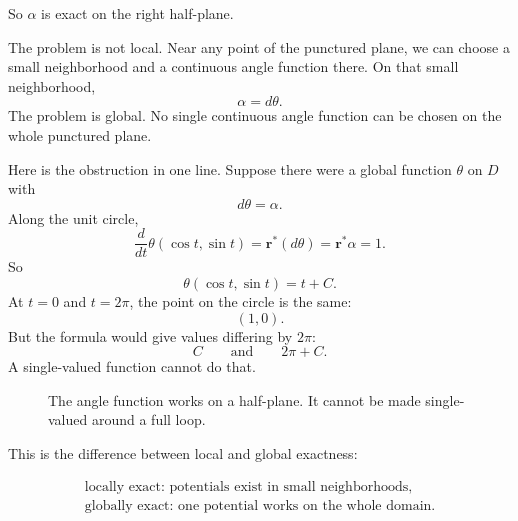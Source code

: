 So \(\alpha\) is exact on the right half-plane.

The problem is not local.  Near any point of the punctured plane, we can choose a
small neighborhood and a continuous angle function there.  On that small neighborhood,
\[
    \alpha=d\theta.
\]
The problem is global.  No single continuous angle function can be chosen on the whole
punctured plane.

Here is the obstruction in one line.  Suppose there were a global function \(\theta\) on
\(D\) with
\[
    d\theta=\alpha.
\]
Along the unit circle,
\[
    \frac{d}{dt}\theta(\cos t,\sin t)
    =
    \mathbf r^*(d\theta)
    =
    \mathbf r^*\alpha
    =
    1.
\]
So
\[
    \theta(\cos t,\sin t)=t+C.
\]
At \(t=0\) and \(t=2\pi\), the point on the circle is the same:
\[
    (1,0).
\]
But the formula would give values differing by \(2\pi\):
\[
    C
    \qquad\text{and}\qquad
    2\pi+C.
\]
A single-valued function cannot do that.

\begin{figure}[h]
\centering
{}
\caption{The angle function works on a half-plane.  It cannot be made single-valued
around a full loop.}
\end{figure}

This is the difference between local and global exactness:

\[
\boxed{
\begin{array}{c}
\text{locally exact: potentials exist in small neighborhoods},\\[1mm]
\text{globally exact: one potential works on the whole domain.}
\end{array}
}
\]

